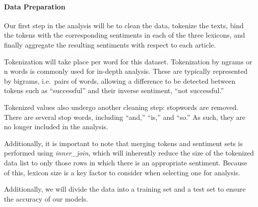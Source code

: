 \documentclass[
]{article}
\begin{document}
\hypertarget{data-preparation}{%
\paragraph{Data Preparation}\label{data-preparation}}

Our first step in the analysis will be to clean the data, tokenize the
texts, bind the tokens with the corresponding sentiments in each of the
three lexicons, and finally aggregate the resulting sentiments with
respect to each article.

Tokenization will take place per word for this dataset. Tokenization by
ngrams or n words is commonly used for in-depth analysis. These are
typically represented by bigrams, i.e.~pairs of words, allowing a
difference to be detected between tokens such as ``successful'' and
their inverse sentiment, ``not successful.''

Tokenized values also undergo another cleaning step: stopwords are
removed. There are several stop words, including ``and,'' ``is,'' and
``so.'' As such, they are no longer included in the analysis.

Additionally, it is important to note that merging tokens and sentiment
sets is performed using \emph{inner\_join}, which will inherently reduce
the size of the tokenized data list to only those rows in which there is
an appropriate sentiment. Because of this, lexicon size is a key factor
to consider when selecting one for analysis.

Additionally, we will divide the data into a training set and a test set
to ensure the accuracy of our models.
\end{document}
